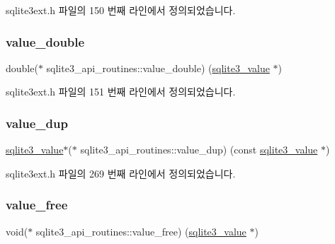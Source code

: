 sqlite3ext.\+h 파일의 150 번째 라인에서 정의되었습니다.

\mbox{\label{structsqlite3__api__routines_a038780bf33da5a73ade808c2fbeb7f91}} 
\subsubsection{\texorpdfstring{value\+\_\+double}{value\_double}}
{\footnotesize\ttfamily double($\ast$ sqlite3\+\_\+api\+\_\+routines\+::value\+\_\+double) (\hyperlink{sqlite3_8h_ac2fa1ecdb2290d9af6010edbd1cbc83c}{sqlite3\+\_\+value} $\ast$)}



sqlite3ext.\+h 파일의 151 번째 라인에서 정의되었습니다.

\mbox{\label{structsqlite3__api__routines_afd13c08d87627ab4b97da21096ccb9bb}} 
\subsubsection{\texorpdfstring{value\+\_\+dup}{value\_dup}}
{\footnotesize\ttfamily \hyperlink{sqlite3_8h_ac2fa1ecdb2290d9af6010edbd1cbc83c}{sqlite3\+\_\+value}$\ast$($\ast$ sqlite3\+\_\+api\+\_\+routines\+::value\+\_\+dup) (const \hyperlink{sqlite3_8h_ac2fa1ecdb2290d9af6010edbd1cbc83c}{sqlite3\+\_\+value} $\ast$)}



sqlite3ext.\+h 파일의 269 번째 라인에서 정의되었습니다.

\mbox{\label{structsqlite3__api__routines_a8ef401c465629f4f61f574cc98e01955}} 
\subsubsection{\texorpdfstring{value\+\_\+free}{value\_free}}
{\footnotesize\ttfamily void($\ast$ sqlite3\+\_\+api\+\_\+routines\+::value\+\_\+free) (\hyperlink{sqlite3_8h_ac2fa1ecdb2290d9af6010edbd1cbc83c}{sqlite3\+\_\+value} $\ast$)}



